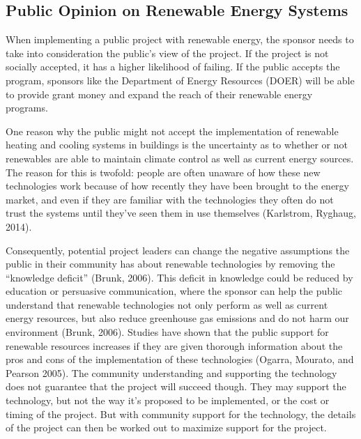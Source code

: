     \subsection{Public Opinion on Renewable Energy Systems}
    \par When implementing a public project with renewable energy, the sponsor needs to take into consideration the public's view of the project. If the project is not socially accepted, it has a higher likelihood of failing. If the public accepts the program, sponsors like the Department of Energy Resources (DOER) will be able to provide grant money and expand the reach of their renewable energy programs.
    \par One reason why the public might not accept the implementation of renewable heating and cooling systems in buildings is the uncertainty as to whether or not renewables are able to maintain climate control as well as current energy sources. The reason for this is twofold: people are often unaware of how these new technologies work because of how recently they have been brought to the energy market, and even if they are familiar with the technologies they often do not trust the systems until they've seen them in use themselves (Karlstrom, Ryghaug, 2014).
    \par Consequently, potential project leaders can change the negative assumptions the public in their community has about renewable technologies by removing the “knowledge deficit” (Brunk, 2006). This deficit in knowledge could be reduced by education or persuasive communication, where the sponsor can help the public understand that renewable technologies not only perform as well as current energy resources, but also reduce greenhouse gas emissions and do not harm our environment (Brunk, 2006). Studies have shown that the public support for renewable resources increases if they are given thorough information about the pros and cons of the implementation of these technologies (Ogarra, Mourato, and Pearson 2005). The community understanding and supporting the technology does not guarantee that the project will succeed though. They may support the technology, but not the way it's proposed to be implemented, or the cost or timing of the project. But with community support for the technology, the details of the project can then be worked out to maximize support for the project.
